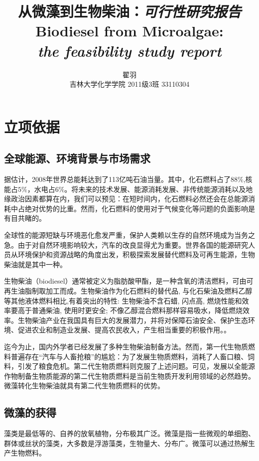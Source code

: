 \documentclass[a4paper,12pt]{report}
\begin{document}
\everymath{\displaystyle}
\author{翟羽 \\ 吉林大学化学学院 2011级3班 33110304}
\title{从微藻到生物柴油：\emph{可行性研究报告}\\Biodiesel from Microalgae: \\ \emph{the feasibility study report}}
\date{}
\maketitle
\renewcommand{\contentsname}{目录}
\tableofcontents
\chapter{立项依据}
\section{全球能源、环境背景与市场需求}
据估计，2008年世界总能耗达到了113亿吨石油当量。其中，化石燃料占了$88 \%$,核能占$5\%$，水电占$6\% $。将未来的技术发展、能源消耗发展、非传统能源消耗以及地缘政治因素都算在内，我们可以预见：在短时间内，化石燃料必然还会在总能源消耗中占绝对优势的比重。\cite{BP2009,EU2007}然而，化石燃料的使用对于气候变化等问题的负面影响是有目共睹的\cite{Brennan2010}。

全球性的能源短缺与环境恶化愈发严重，保护人类赖以生存的自然环境成为当务之急。由于对自然环境影响较大，汽车的改良显得尤为重要。世界各国的能源研究人员从环境保护和资源战略的角度出发，积极探索发展替代燃料及可再生能源，生物柴油就是其中一种。\cite{Zhu2004}

生物柴油（biodiesel）通常被定义为脂肪酸甲酯，是一种含氧的清洁燃料，可由可再生油脂制取加工而成。生物柴油作为化石燃料的替代品, 与化石柴油及燃料乙醇等其他液体燃料相比,有着突出的特性: 生物柴油不含石蜡, 闪点高, 燃烧性能和效率要高于普通柴油, 使用时更安全; 不像乙醇混合燃料那样容易吸水，降低燃烧效率。\cite{Song2008}生物柴油产业在我国具有巨大的发展潜力，并将对保障石油安全、保护生态环境、促进农业和制造业发展、提高农民收入，产生相当重要的积极作用。\cite{Zhu2004}。

迄今为止，国内外学者已经发展了多种生物柴油制备方法。然而，第一代生物质燃料普遍存在“汽车与人畜抢粮”的尴尬：为了发展生物质燃料，消耗了人畜口粮、饲料，引发了粮食危机。\cite{FAO2007,FAO2008}第二代生物质燃料则克服了上述问题。可见，发展以全能源作物制备生物质能源的第二代生物质燃料是当前生物质开发利用领域的必然趋势。\cite{Brennan2010,Schenk2008}微藻转化生物柴油就具有第二代生物质燃料的优势\cite{Brennan2010}。

\section{微藻的获得}
\label{much}
藻类是最低等的、自养的放氧植物，分布极其广泛。微藻是指一些微观的单细胞、群体或丝状的藻类，大多数是浮游藻类，生物量大、分布广。微藻可以通过热解生产生物燃料。\cite{Miao2003}
\end{document}
